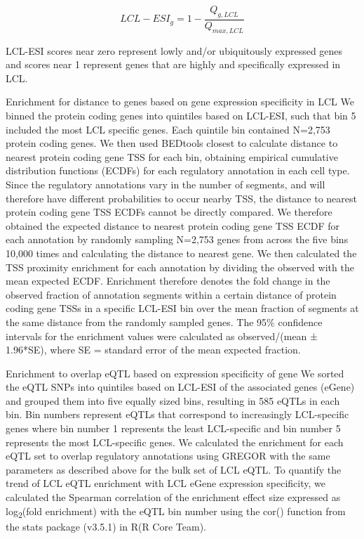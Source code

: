 \[ LCL-ESI_g = 1 - \frac{Q_{g, LCL}}{Q_{max, LCL}} \]
 
LCL-ESI scores near zero represent lowly and/or ubiquitously expressed genes and scores near 1 represent genes that are highly and specifically expressed in LCL. 

Enrichment for distance to genes based on gene expression specificity in LCL
We binned the protein coding genes into quintiles based on LCL-ESI, such that bin 5 included the most LCL specific genes. Each quintile bin contained N=2,753 protein coding genes. We then used BEDtools closest to calculate distance to nearest protein coding gene TSS for each bin, obtaining empirical cumulative distribution functions (ECDFs) for each regulatory annotation in each cell type. Since the regulatory annotations vary in the number of segments, and will therefore have different probabilities to occur nearby TSS, the distance to nearest protein coding gene TSS ECDFs cannot be directly compared. We therefore obtained the expected distance to nearest protein coding gene TSS ECDF for each annotation by randomly sampling N=2,753 genes from across the five bins 10,000 times and calculating the distance to nearest gene. We then calculated the TSS proximity enrichment for each annotation by dividing the observed with the mean expected ECDF. Enrichment therefore denotes the fold change in the observed fraction of annotation segments within a certain distance of protein coding gene TSSs in a specific LCL-ESI bin over the mean fraction of segments at the same distance from the randomly sampled genes. The 95\% confidence intervals for the enrichment values were calculated as observed/(mean ± 1.96*SE), where SE = standard error of the mean expected fraction. 

Enrichment to overlap eQTL based on expression specificity of gene
We sorted the eQTL SNPs into quintiles based on LCL-ESI of the associated genes (eGene) and grouped them into five equally sized bins, resulting in 585 eQTLs in each bin. Bin numbers represent eQTLs that correspond to increasingly LCL-specific genes where bin number 1 represents the least LCL-specific and bin number 5 represents the most LCL-specific genes. We calculated the enrichment for each eQTL set to overlap regulatory annotations using GREGOR with the same parameters as described above for the bulk set of LCL eQTL. To quantify the trend of LCL eQTL enrichment with LCL eGene expression specificity, we calculated the Spearman correlation of the enrichment effect size expressed as log\textsubscript{2}(fold enrichment) with the eQTL bin number using the cor() function from the stats package (v3.5.1) in R(R Core Team).

